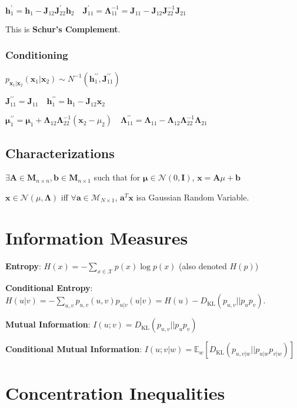 \documentclass[9pt]{article}
\begin{document}
\begin{multicols}{2}
$\mathbf{h}_1^\prime = \mathbf{h}_1 - \mathbf{J}_{12}\mathbf{J}_{22}^\prime \mathbf{h}_2 \quad \mathbf{J}_{11}^\prime = \mathbf{\Lambda}_{11}^{-1} = \mathbf{J}_{11} - \mathbf{J}_{12}\mathbf{J}_{22}^{-1}\mathbf{J}_{21}$ 

This is \textbf{Schur's Complement}. 
\subsubsection{Conditioning}
$p_{\mathbf{x}_1|\mathbf{x}_2}(\mathbf{x}_1 | \mathbf{x}_2) \sim N^{-1}(\mathbf{h}_1^{\prime\prime}, \mathbf{J}_{11}^{\prime\prime})$

$\mathbf{J}_{11}^{\prime\prime} = \mathbf{J}_{11} \quad \mathbf{h}_1^{\prime\prime} = \mathbf{h}_1 - \mathbf{J}_{12}\mathbf{x}_2$

$\mathbf{\mu}_1^{\prime\prime} = \mathbf{\mu}_1 + \mathbf{\Lambda}_{12}\mathbf{\Lambda}_{22}^{-1}(\mathbf{x}_2 - \mu_2) \quad \mathbf{\Lambda}_{11}^{\prime\prime} = \mathbf{\Lambda}_{11} - \mathbf{\Lambda}_{12}\mathbf{\Lambda}_{22}^{-1}\mathbf{\Lambda}_{21}$

\subsection{Characterizations}
$\exists \mathbf{A} \in \mathbf{M}_{n \times n}, \mathbf{b} \in\mathbf{M}_{n \times 1}$ such that for $\mathbf{\mu} \in \mathcal{N}(0,\mathbf{I})$, $\mathbf{x} = \mathbf{A} \mu + \mathbf{b}$ 

$\textbf{x} \in \mathcal{N}(\mu, \mathbf{\Lambda})$ iff $\forall 
\mathbf{a} \in \mathcal{M}_{N \times 1}$, $\mathbf{a}^{T}\mathbf{x}$
isa Gaussian Random Variable.

\section{Information Measures}

\textbf{Entropy}: $H(x)=-\sum_{x \in \mathcal{X}} p(x)\log p(x)$
(also denoted $H(p)$)

\textbf{Conditional Entropy}: $H(u|v)=-\sum_{u,v} p_{u,v}(u,v)p_{u|v}(u|v) = H(u) - D_{\text{KL}}(p_{u,v} || p_{u}p_{v})$.

\textbf{Mutual Information}: $I(u;v)=D_{\text{KL}}(p_{u,v}||p_{u}p_{v})$

\textbf{Conditional Mutual Information}: $I(u;v|w)=\mathbb{E}_{w}
[D_{\text{KL}}(p_{u,v|w}||p_{u|w}p_{v|w})]$

\section{Concentration Inequalities}


\end{multicols}
\end{document}
